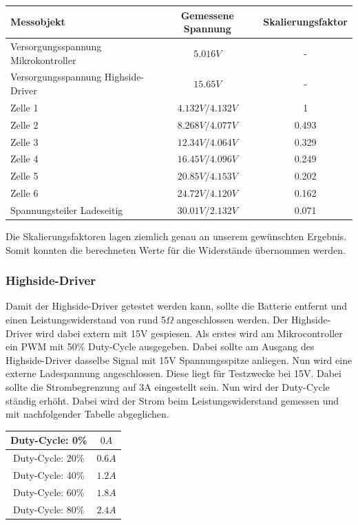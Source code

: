 \begin{center}
	\begin{tabular}{|l|c|c|}
		\hline 
		Messobjekt & Gemessene Spannung & Skalierungsfaktor \\ \hline
		Versorgungsspannung Mikrokontroller & $5.016V$ & - \\ \hline
		Versorgungsspannung Highside-Driver & $15.65V$ & - \\ \hline
		Zelle 1 & $4.132V / 4.132V$ & 1 \\ \hline
		Zelle 2 & $8.268V / 4.077V$ & 0.493 \\ \hline
		Zelle 3 & $12.34V / 4.064V$ & 0.329 \\ \hline
		Zelle 4 & $16.45V / 4.096V$ & 0.249 \\ \hline
		Zelle 5 & $20.85V / 4.153V$ & 0.202 \\ \hline
		Zelle 6 & $24.72V / 4.120V$ & 0.162 \\ \hline
		Spannungsteiler Ladeseitig & $30.01V / 2.132V$ & 0.071\\ \hline
	\end{tabular} 
	\label{tab:Spannungsmessungen}
\end{center}

Die Skalierungsfaktoren lagen ziemlich genau an unserem gewünschten Ergebnis. Somit konnten die berechneten Werte für die Widerstände übernommen werden.  

\subsubsection*{Highside-Driver}
\label{Highside-Driver}
Damit der Highside-Driver getestet werden kann, sollte die Batterie entfernt und einen Leistungswiderstand von rund 5$\Omega$ angeschlossen werden. Der Highside-Driver wird dabei extern mit 15V gespiesen. Als erstes wird am Mikrocontroller ein PWM mit 50\% Duty-Cycle ausgegeben. Dabei sollte am Ausgang des Highside-Driver dasselbe Signal mit 15V Spannungsspitze anliegen. Nun wird eine externe Ladespannung angeschlossen. Diese liegt für Testzwecke bei 15V. Dabei sollte die Strombegrenzung auf 3A eingestellt sein. Nun wird der Duty-Cycle ständig erhöht. Dabei wird der Strom beim Leistungswiderstand gemessen und mit nachfolgender Tabelle abgeglichen.

\begin{center}
	\begin{tabular}{|c|c|}
		\hline 
		Duty-Cycle: 0\% & $0A$ \\ \hline
		Duty-Cycle: 20\% & $0.6A$ \\ \hline
		Duty-Cycle: 40\% & $1.2A$ \\ \hline
		Duty-Cycle: 60\% & $1.8A$ \\ \hline
		Duty-Cycle: 80\% & $2.4A$ \\ \hline
	\end{tabular} 
	\label{tab:LadestromHighsideDriver}
\end{center}

